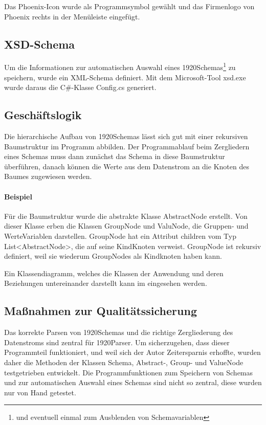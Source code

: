 Das Phoenix-Icon wurde als Programmsymbol gewählt und das Firmenlogo von Phoenix rechts in der Menüleiste eingefügt.

\subsection{XSD-Schema}
Um die Informationen zur automatischen Auswahl eines 1920Schemas\footnote{und eventuell einmal zum Ausblenden von Schemavariablen} zu speichern, wurde ein XML-Schema definiert. Mit dem Microsoft-Tool xsd.exe wurde daraus die C\#-Klasse Config.cs generiert.

\subsection{Geschäftslogik}
\label{sec:Geschaeftslogik}
Die hierarchische Aufbau von 1920Schemas lässt sich gut mit einer rekursiven Baumstruktur im Programm abbilden. Der Programmablauf beim Zergliedern eines Schemas muss dann zunächst das Schema in diese Baumstruktur überführen, danach können die Werte aus dem Datenstrom an die Knoten des Baumes zugewiesen werden.

\paragraph{Beispiel}
Für die Baumstruktur wurde die abstrakte Klasse AbstractNode erstellt. Von dieser Klasse erben die Klassen GroupNode und ValuNode, die Gruppen- und WerteVariablen darstellen. GroupNode hat ein Attribut children vom Typ List<AbstractNode>, die auf seine KindKnoten verweist. GroupNode ist rekursiv definiert, weil sie wiederum GroupNodes als Kindknoten haben kann.

Ein Klassendiagramm, welches die Klassen der Anwendung und deren Beziehungen untereinander darstellt kann im  eingesehen werden.


\subsection{Maßnahmen zur Qualitätssicherung}
\label{sec:Qualitaetssicherung}
Das korrekte Parsen von 1920Schemas und die richtige Zergliederung des Datenstroms sind zentral für 1920Parser. Um sicherzugehen, dass dieser Programmteil funktioniert, und weil sich der Autor Zeitersparnis erhoffte, wurden daher die Methoden der Klassen Schema, Abstract-, Group- und ValueNode  testgetrieben entwickelt.
Die Programmfunktionen zum Speichern von Schemas und zur automatischen Auswahl eines Schemas sind nicht so zentral, diese wurden nur von Hand getestet.

